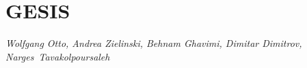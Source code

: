 \documentclass[fleqn]{template}
\begin{document}
    \section{GESIS}
    \emph{Wolfgang Otto, Andrea Zielinski, Behnam Ghavimi, Dimitar Dimitrov, Narges~Tavakolpoursaleh}
    
    
    
    
    
    
    
    
    
\end{document}

